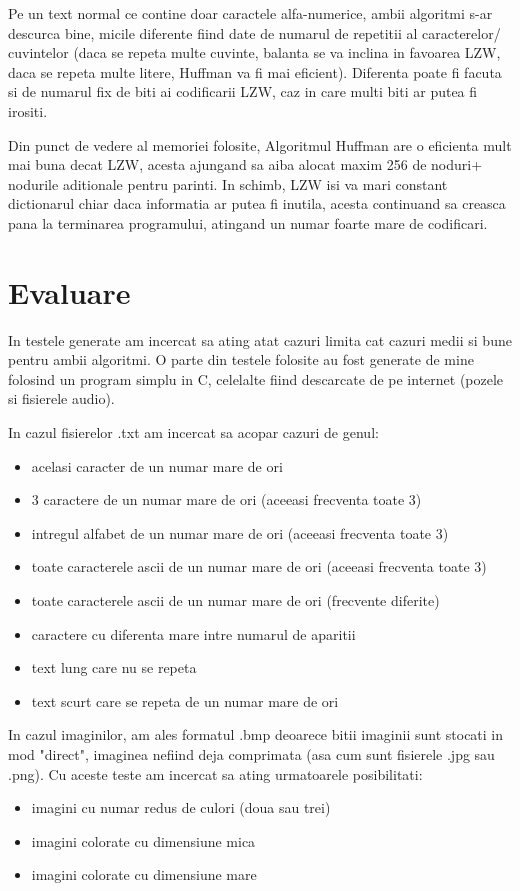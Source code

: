 \documentclass[runningheads]{llncs}
\begin{document}
Pe un text normal ce contine doar caractele alfa-numerice, ambii algoritmi s-ar descurca bine, micile diferente fiind date de numarul de repetitii al caracterelor/ cuvintelor (daca se repeta
multe cuvinte, balanta se va inclina in favoarea LZW, daca se repeta multe litere, Huffman va fi mai eficient). Diferenta poate fi facuta si de numarul fix de biti ai
codificarii LZW, caz in care multi biti ar putea fi irositi.

Din punct de vedere al memoriei folosite, Algoritmul Huffman are o eficienta mult mai buna decat LZW, acesta ajungand sa aiba alocat maxim 256 de noduri+ nodurile aditionale pentru parinti.
In schimb, LZW isi va mari constant dictionarul chiar daca informatia ar putea fi inutila, acesta continuand sa creasca pana la terminarea programului, atingand un numar foarte mare de codificari.


\section{Evaluare}

In testele generate am incercat sa ating atat cazuri limita cat cazuri medii si bune pentru ambii algoritmi.
O parte din testele folosite au fost generate de mine folosind un program simplu in C, celelalte fiind descarcate de pe internet (pozele si fisierele audio).

In cazul fisierelor .txt am incercat sa acopar cazuri de genul:
\begin{itemize}
    \item acelasi caracter de un numar mare de ori
    \item 3 caractere de un numar mare de ori (aceeasi frecventa toate 3)
    \item intregul alfabet de un numar mare de ori (aceeasi frecventa toate 3)
    \item toate caracterele ascii de un numar mare de ori (aceeasi frecventa toate 3)
    \item toate caracterele ascii de un numar mare de ori (frecvente diferite)
    \item caractere cu diferenta mare intre numarul de aparitii
    \item text lung care nu se repeta 
    \item text scurt care se repeta de un numar mare de ori
\end{itemize}

In cazul imaginilor, am ales formatul .bmp deoarece bitii imaginii sunt stocati in mod "direct", imaginea nefiind deja comprimata (asa cum sunt fisierele .jpg sau .png).
Cu aceste teste am incercat sa ating urmatoarele posibilitati:
\begin{itemize}
    \item imagini cu numar redus de culori (doua sau trei)
    \item imagini colorate cu dimensiune mica
    \item imagini colorate cu dimensiune mare
\end{itemize}
\end{document}

